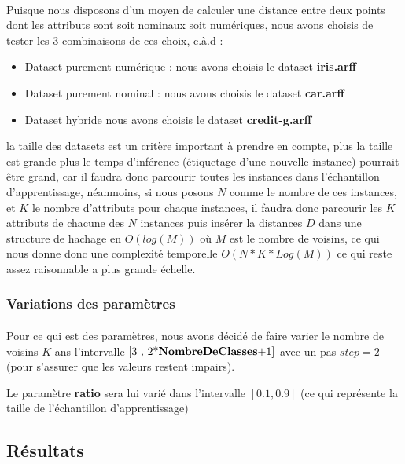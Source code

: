 			\paragraph{}
			Puisque nous disposons d'un moyen de calculer une distance entre deux points dont les attributs sont soit nominaux soit numériques, nous avons choisis de tester les 3 combinaisons de ces choix, c.à.d : 
			\begin{itemize}
				\item Dataset purement numérique : nous avons choisis le dataset \textbf{iris.arff}
				\item Dataset purement nominal : nous avons choisis le dataset \textbf{car.arff}
				\item Dataset hybride nous avons choisis le dataset \textbf{credit-g.arff}
			\end{itemize}
			\par la taille des datasets est un critère important à prendre en compte, plus la taille est grande plus le temps d'inférence (étiquetage d'une nouvelle instance) pourrait être grand, car il faudra donc parcourir toutes les instances dans l'échantillon d'apprentissage, néanmoins, si nous posons $N$ comme le nombre de ces instances, et $K$ le nombre d'attributs pour chaque instances, il faudra donc parcourir les $K$ attributs de chacune des $N$ instances puis insérer la distances $D$ dans une structure de hachage en $O(log(M))$ où $M$ est le nombre de voisins, ce qui nous donne donc une complexité temporelle $O(N*K*Log(M))$ ce qui reste assez raisonnable a plus grande échelle.
		\subsubsection{Variations des paramètres}
			\paragraph{}
			Pour ce qui est des paramètres, nous avons décidé de faire varier le nombre de voisins $K$ ans l'intervalle $\left[ \text{3 , 2*\textbf{NombreDeClasses}+1}\right]$ avec un pas $step = 2$ (pour s'assurer que les valeurs restent impairs).
			\par 
			Le paramètre \textbf{ratio} sera lui varié dans l'intervalle $\left[ 0.1 ,0.9 \right]$ (ce qui représente la taille de l'échantillon d'apprentissage)
		\subsection{Résultats}
